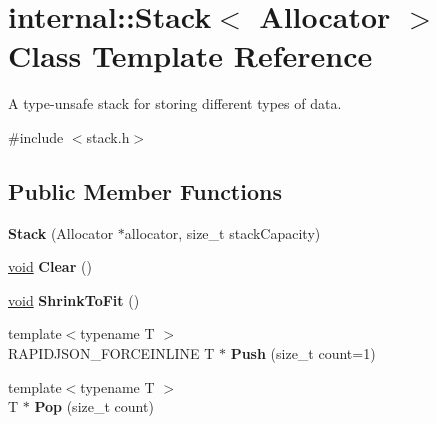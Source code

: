 \hypertarget{classinternal_1_1_stack}{}\section{internal\+:\+:Stack$<$ Allocator $>$ Class Template Reference}
\label{classinternal_1_1_stack}


A type-\/unsafe stack for storing different types of data.  




{\ttfamily \#include $<$stack.\+h$>$}

\subsection*{Public Member Functions}
\begin{DoxyCompactItemize}
\item 
\hypertarget{classinternal_1_1_stack_af09ab91f9e5143deccf7c9af837f451e}{}{\bfseries Stack} (Allocator $\ast$allocator, size\+\_\+t stack\+Capacity)\label{classinternal_1_1_stack_af09ab91f9e5143deccf7c9af837f451e}

\item 
\hypertarget{classinternal_1_1_stack_a02da31665a372738e81ded2f7b7d598e}{}\hyperlink{_s_d_l__audio_8h_a52835ae37c4bb905b903cbaf5d04b05f}{void} {\bfseries Clear} ()\label{classinternal_1_1_stack_a02da31665a372738e81ded2f7b7d598e}

\item 
\hypertarget{classinternal_1_1_stack_a3852b8494d69c91f6a238a51572e591e}{}\hyperlink{_s_d_l__audio_8h_a52835ae37c4bb905b903cbaf5d04b05f}{void} {\bfseries Shrink\+To\+Fit} ()\label{classinternal_1_1_stack_a3852b8494d69c91f6a238a51572e591e}

\item 
\hypertarget{classinternal_1_1_stack_a8038223ec0ed6ea92bb5f48e645a25ca}{}{\footnotesize template$<$typename T $>$ }\\R\+A\+P\+I\+D\+J\+S\+O\+N\+\_\+\+F\+O\+R\+C\+E\+I\+N\+L\+I\+N\+E T $\ast$ {\bfseries Push} (size\+\_\+t count=1)\label{classinternal_1_1_stack_a8038223ec0ed6ea92bb5f48e645a25ca}

\item 
\hypertarget{classinternal_1_1_stack_a8545a8ccba595ac6e4ade9784474aa1c}{}{\footnotesize template$<$typename T $>$ }\\T $\ast$ {\bfseries Pop} (size\+\_\+t count)\label{classinternal_1_1_stack_a8545a8ccba595ac6e4ade9784474aa1c}


\end{DoxyCompactItemize}
